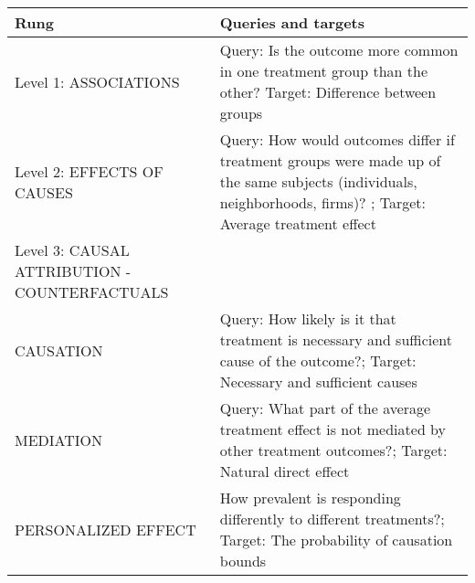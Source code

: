 \documentclass[
]{book}
\begin{document}
\begin{longtable}[]{@{}ll@{}}
\toprule
\begin{minipage}[b]{0.18\columnwidth}\raggedright
Rung\strut
\end{minipage} & \begin{minipage}[b]{0.76\columnwidth}\raggedright
Queries and targets\strut
\end{minipage}\tabularnewline
\midrule
\endhead
\begin{minipage}[t]{0.18\columnwidth}\raggedright
Level 1: ASSOCIATIONS\strut
\end{minipage} & \begin{minipage}[t]{0.76\columnwidth}\raggedright
Query: Is the outcome more common in one treatment group than the other?
Target: Difference between groups\strut
\end{minipage}\tabularnewline
\begin{minipage}[t]{0.18\columnwidth}\raggedright
Level 2: EFFECTS OF CAUSES\strut
\end{minipage} & \begin{minipage}[t]{0.76\columnwidth}\raggedright
Query: How would outcomes differ if treatment groups were made up of the
same subjects (individuals, neighborhoods, firms)? ; Target: Average
treatment effect\strut
\end{minipage}\tabularnewline
\begin{minipage}[t]{0.18\columnwidth}\raggedright
Level 3: CAUSAL ATTRIBUTION - COUNTERFACTUALS\strut
\end{minipage} & \begin{minipage}[t]{0.76\columnwidth}\raggedright
\strut
\end{minipage}\tabularnewline
\begin{minipage}[t]{0.18\columnwidth}\raggedright
CAUSATION\strut
\end{minipage} & \begin{minipage}[t]{0.76\columnwidth}\raggedright
Query: How likely is it that treatment is necessary and sufficient cause
of the outcome?; Target: Necessary and sufficient causes\strut
\end{minipage}\tabularnewline
\begin{minipage}[t]{0.18\columnwidth}\raggedright
MEDIATION\strut
\end{minipage} & \begin{minipage}[t]{0.76\columnwidth}\raggedright
Query: What part of the average treatment effect is not mediated by
other treatment outcomes?; Target: Natural direct effect\strut
\end{minipage}\tabularnewline
\begin{minipage}[t]{0.18\columnwidth}\raggedright
️PERSONALIZED EFFECT\strut
\end{minipage} & \begin{minipage}[t]{0.76\columnwidth}\raggedright
How prevalent is responding differently to different treatments?;
Target: The probability of causation bounds\strut
\end{minipage}\tabularnewline
\bottomrule
\end{longtable}
\end{document}
